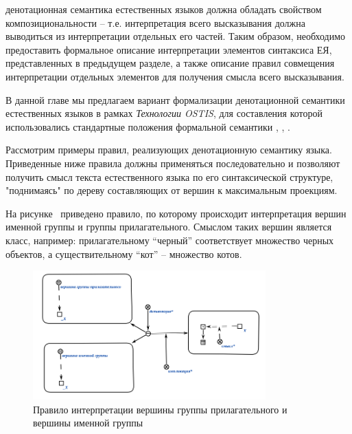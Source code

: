 денотационная семантика естественных языков должна обладать свойством композициональности -- т.е. интерпретация всего высказывания должна выводиться из интерпретации отдельных его частей. Таким образом, необходимо предоставить формальное описание интерпретации элементов синтаксиса ЕЯ, представленных в предыдущем разделе, а также описание правил совмещения интерпретации отдельных элементов для получения смысла всего высказывания.

В данной главе мы предлагаем вариант формализации денотационной семантики естественных языков в рамках \textit{Технологии OSTIS}, для составления которой использовались стандартные положения формальной семантики , , .

Рассмотрим примеры правил, реализующих денотационную семантику языка. Приведенные ниже правила должны применяться последовательно и позволяют получить смысл текста естественного языка по его синтаксической структуре, "поднимаясь"{} по дереву составляющих от вершин к максимальным проекциям.

На рисунке~\textit{} приведено правило, по которому происходит интерпретация вершин именной группы и группы прилагательного.
Смыслом таких вершин является класс, например: прилагательному ``черный'' соответствует множество черных объектов, а существительному ``кот'' -- множество котов.

\begin{figure}[H]
    \centering
    \includegraphics[width=0.8\textwidth]{images/part2/chapter_lang/d_sem_1}
    \caption{Правило интерпретации вершины группы прилагательного и вершины именной группы}
    \label{fig:d_sem_1}
\end{figure}

